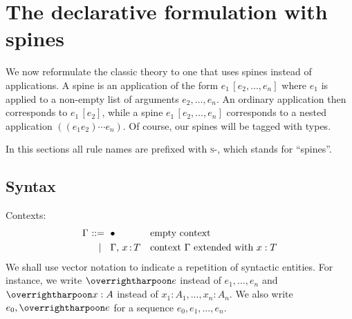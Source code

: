 \section{The declarative formulation with spines}
\label{sec:declarative-formulation}

We now reformulate the classic theory to one that uses spines instead of applications. A
spine is an application of the form $e_1 \, [e_2, \ldots, e_n]$ where $e_1$ is applied to
a non-empty list of arguments $e_2, \ldots, e_n$. An ordinary application then corresponds
to $e_1 \, [e_2]$, while a spine $e_1 \, [e_2, \ldots, e_n]$ corresponds to a nested
application $((e_1 e_2) \cdots e_n)$. Of course, our spines will be tagged with types.

In this sections all rule names are prefixed with \textsc{s-}, which stands for ``spines''.

\subsection{Syntax}
\label{sec:syntax}

Contexts:
%
\begin{equation*}
  \Gamma
  \begin{aligned}[t]
    \ \mathrel{{:}{:}{=}}\    {}& \bullet & & \text{empty context}\\
    \ \mid\ \  {}& \Gamma,\, x\, {:}\, T & & \text{context $\Gamma$ extended with $x : T$}
  \end{aligned}
\end{equation*}
%
We shall use vector notation to indicate a repetition of syntactic entities. For instance,
we write $\many{e}$ instead of $e_1, \ldots, e_n$ and $\many{x : A}$ instead of
$x_1 : A_1, \ldots, x_n : A_n$. We also write $e_0, \many{e}$ for a sequence
$e_0, e_1, \ldots, e_n$.

